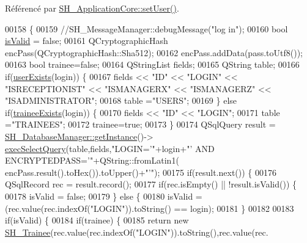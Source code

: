 Référencé par \hyperlink{classSH__ApplicationCore_a2dd5c029a2ea348f1dfd0a60dea476e4}{S\-H\-\_\-\-Application\-Core\-::set\-User()}.


\begin{DoxyCode}
00158 \{
00159     \textcolor{comment}{//SH\_MessageManager::debugMessage("log in");}
00160     \textcolor{keywordtype}{bool} \hyperlink{classSH__User_a07de5c02b2a02b3bb2b0aaf0886bb4d9}{isValid} = \textcolor{keyword}{false};
00161     QCryptographicHash encPass(QCryptographicHash::Sha512);
00162     encPass.addData(pass.toUtf8());
00163     \textcolor{keywordtype}{bool} trainee=\textcolor{keyword}{false};
00164     QStringList fields;
00165     QString table;
00166     \textcolor{keywordflow}{if}(\hyperlink{classSH__User_a64161b35866b1c635d5f4214095a2b1e}{userExists}(login)) \{
00167         fields << \textcolor{stringliteral}{"ID"} << \textcolor{stringliteral}{"LOGIN"} << \textcolor{stringliteral}{"ISRECEPTIONIST"} << \textcolor{stringliteral}{"ISMANAGERX"} << \textcolor{stringliteral}{"ISMANAGERZ"} << \textcolor{stringliteral}{"ISADMINISTRATOR"};
00168         table =\textcolor{stringliteral}{"USERS"};
00169     \} \textcolor{keywordflow}{else} \textcolor{keywordflow}{if}(\hyperlink{classSH__User_adfc35c967cb405f4a14886676612fbb7}{traineeExists}(login)) \{
00170         fields << \textcolor{stringliteral}{"ID"} << \textcolor{stringliteral}{"LOGIN"};
00171         table =\textcolor{stringliteral}{"TRAINEES"};
00172         trainee=\textcolor{keyword}{true};
00173     \}
00174     QSqlQuery result = \hyperlink{classSH__DatabaseManager_a31198eb4de0f8b18e3fa0eed09f24d19}{SH\_DatabaseManager::getInstance}()->
      \hyperlink{classSH__DatabaseManager_ab8f9850cb68444ab9a4e613b36a3b044}{execSelectQuery}(table,fields,\textcolor{stringliteral}{"LOGIN='"}+login+\textcolor{stringliteral}{"' AND ENCRYPTEDPASS='"}+QString::fromLatin1(
      encPass.result().toHex()).toUpper()+\textcolor{stringliteral}{"'"});
00175     \textcolor{keywordflow}{if}(result.next()) \{
00176         QSqlRecord rec = result.record();
00177         \textcolor{keywordflow}{if}(rec.isEmpty() || !result.isValid()) \{
00178             isValid = \textcolor{keyword}{false};
00179         \} \textcolor{keywordflow}{else} \{
00180             isValid = (rec.value(rec.indexOf(\textcolor{stringliteral}{"LOGIN"})).toString() == login);
00181         \}
00182 
00183         \textcolor{keywordflow}{if}(isValid) \{
00184             \textcolor{keywordflow}{if}(trainee) \{
00185                 \textcolor{keywordflow}{return} \textcolor{keyword}{new} \hyperlink{classSH__Trainee}{SH\_Trainee}(rec.value(rec.indexOf(\textcolor{stringliteral}{"LOGIN"})).toString(),rec.value(rec.

\end{DoxyCode}

